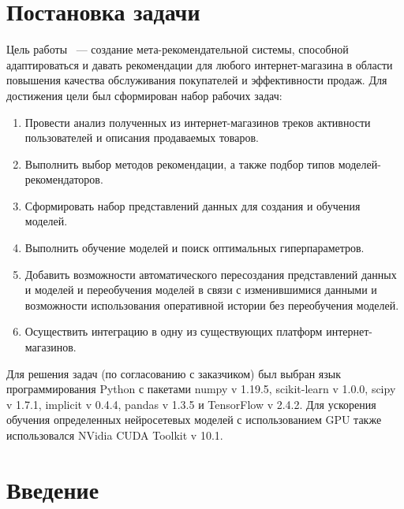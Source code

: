 \documentclass[14pt]{mmcs_article}
\begin{document}

\renewcommand{\contentsname}{Оглавление}

\tableofcontents

\newpage
{}

\section*{Постановка задачи}

Цель работы ~--- создание мета-рекомендательной системы, способной адаптироваться и давать рекомендации для любого интернет-магазина в области повышения качества обслуживания покупателей и эффективности продаж. Для достижения цели был сформирован набор рабочих задач:
\begin{enumerate}
	\item Провести анализ полученных из интернет-магазинов треков активности пользователей и описания продаваемых товаров.
	\item Выполнить выбор методов рекомендации, а также подбор типов моделей-рекомендаторов.
	\item Сформировать набор представлений данных для создания и обучения моделей.
	\item Выполнить обучение моделей и поиск оптимальных гиперпараметров.
	\item Добавить возможности автоматического пересоздания представлений данных и моделей и переобучения моделей в связи с изменившимися данными и возможности использования оперативной истории без переобучения моделей.
	\item Осуществить интеграцию в одну из существующих платформ интернет-магазинов.
\end{enumerate}

Для решения задач (по согласованию с заказчиком) был выбран язык программирования Python с пакетами numpy v 1.19.5, scikit-learn v 1.0.0, scipy v 1.7.1, implicit v 0.4.4, pandas v 1.3.5 и TensorFlow v 2.4.2. Для ускорения обучения определенных нейросетевых моделей с использованием GPU также использовался NVidia CUDA Toolkit v 10.1.
 
\newpage
{}
\section*{Введение}
\end{document}
